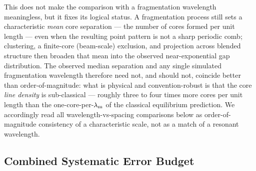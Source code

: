 \documentclass[usenatbib,twoside,twocolumn]{mnras}
\begin{document}
This does not make the comparison with a fragmentation wavelength meaningless, but it fixes its logical status. A fragmentation process still sets a characteristic \emph{mean} core separation --- the number of cores formed per unit length --- even when the resulting point pattern is not a sharp periodic comb; clustering, a finite-core (beam-scale) exclusion, and projection across blended structure then broaden that mean into the observed near-exponential gap distribution. The observed median separation and any single simulated fragmentation wavelength therefore need not, and should not, coincide better than order-of-magnitude: what is physical and convention-robust is that the core \emph{line density} is sub-classical --- roughly three to four times more cores per unit length than the one-core-per-$\lambda_{\rm m}$ of the classical equilibrium prediction. We accordingly read all wavelength-vs-spacing comparisons below as order-of-magnitude consistency of a characteristic scale, not as a match of a resonant wavelength.

\subsection{Combined Systematic Error Budget}
\label{sec:error_budget}
\end{document}
